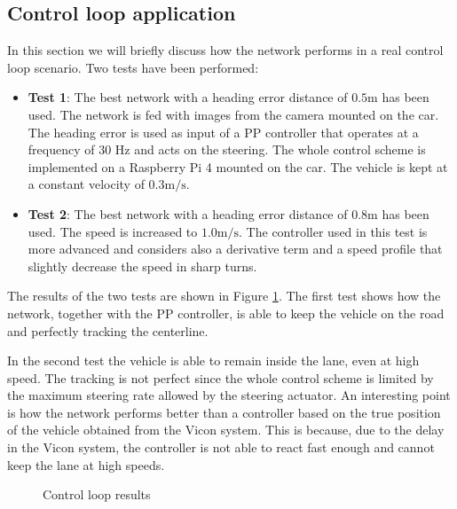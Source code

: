 \documentclass[a4paper,12pt,sort&compress]{article}
\begin{document}
\clearpage





\subsection{Control loop application}
    In this section we will briefly discuss how the network performs in a real control loop
    scenario. Two tests have been performed: 
    \begin{itemize}
        \item \textbf{Test 1}: The best network with a heading error distance of $\num{0.5} \si{\meter}$ has
        been used. The network is fed with images from the camera mounted on the car. The heading
        error is used as input of a PP controller that operates at a frequency of 30 Hz and acts on
        the steering. 
        The whole control scheme is implemented on a Raspberry Pi 4 mounted on the car. The vehicle
        is kept at a constant velocity of $\num{0.3} \si{\meter\per\second}$.
        \item \textbf{Test 2}: The best network with a heading error distance of $\num{0.8}\si{\meter}$  has
        been used. The speed is increased to $\num{1.0} \si{\meter\per\second}$. The controller used
        in this test is more advanced and considers also a derivative term and a speed profile that
        slightly decrease the speed in sharp turns. 
    \end{itemize}

    The results of the two tests are shown in Figure \ref{fig:control_loop}. The first test shows
    how the network, together with the PP controller, is able to keep the vehicle on the road and
    perfectly tracking the centerline. 

    In the second test the vehicle is able to remain inside the lane, even at high speed. The
    tracking is not perfect since the whole control scheme is limited by the maximum steering rate
    allowed by the steering actuator. An interesting point is how the network performs better than a
    controller based on the true position of the vehicle obtained from the Vicon system. This is
    because, due to the delay in the Vicon system, the controller is not able to react fast enough
    and cannot keep the lane at high speeds.

    \begin{figure}
        \centering
        \caption{Control loop results}
        \label{fig:control_loop}
    \end{figure}
\end{document}
